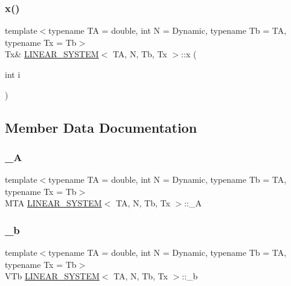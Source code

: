 \subsubsection{\texorpdfstring{x()}{x()}\hspace{0.1cm}{\footnotesize\ttfamily [2/2]}}
{\footnotesize\ttfamily template$<$typename TA = double, int N = Dynamic, typename Tb = TA, typename Tx = Tb$>$ \\
Tx\& \mbox{\hyperlink{class_l_i_n_e_a_r___s_y_s_t_e_m}{L\+I\+N\+E\+A\+R\+\_\+\+S\+Y\+S\+T\+EM}}$<$ TA, N, Tb, Tx $>$\+::x (\begin{DoxyParamCaption}\item[{int}]{i }\end{DoxyParamCaption})\hspace{0.3cm}{\ttfamily [inline]}}



\subsection{Member Data Documentation}
\mbox{\label{class_l_i_n_e_a_r___s_y_s_t_e_m_afee92f4a1bc570f9ead4742047756525}} 
\subsubsection{\texorpdfstring{\+\_\+A}{\_A}}
{\footnotesize\ttfamily template$<$typename TA = double, int N = Dynamic, typename Tb = TA, typename Tx = Tb$>$ \\
M\+TA \mbox{\hyperlink{class_l_i_n_e_a_r___s_y_s_t_e_m}{L\+I\+N\+E\+A\+R\+\_\+\+S\+Y\+S\+T\+EM}}$<$ TA, N, Tb, Tx $>$\+::\+\_\+A\hspace{0.3cm}{\ttfamily [protected]}}

\mbox{\label{class_l_i_n_e_a_r___s_y_s_t_e_m_a2a040e59b49e900b61c4db4385623fd0}} 
\subsubsection{\texorpdfstring{\+\_\+b}{\_b}}
{\footnotesize\ttfamily template$<$typename TA = double, int N = Dynamic, typename Tb = TA, typename Tx = Tb$>$ \\
V\+Tb \mbox{\hyperlink{class_l_i_n_e_a_r___s_y_s_t_e_m}{L\+I\+N\+E\+A\+R\+\_\+\+S\+Y\+S\+T\+EM}}$<$ TA, N, Tb, Tx $>$\+::\+\_\+b\hspace{0.3cm}{\ttfamily [protected]}}

